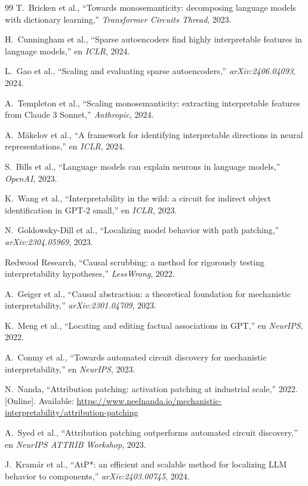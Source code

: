 \documentclass[11pt,a4paper]{report}
\theoremstyle{definition}
\begin{document}
\begin{thebibliography}{99}
T.~Bricken et al., ``Towards monosemanticity: decomposing language models with dictionary learning,'' \emph{Transformer Circuits Thread}, 2023.

H.~Cunningham et al., ``Sparse autoencoders find highly interpretable features in language models,'' en \emph{ICLR}, 2024.

L.~Gao et al., ``Scaling and evaluating sparse autoencoders,'' \emph{arXiv:2406.04093}, 2024.

A.~Templeton et al., ``Scaling monosemanticity: extracting interpretable features from Claude 3 Sonnet,'' \emph{Anthropic}, 2024.

A.~Mäkelov et al., ``A framework for identifying interpretable directions in neural representations,'' en \emph{ICLR}, 2024.

S.~Bills et al., ``Language models can explain neurons in language models,'' \emph{OpenAI}, 2023.

K.~Wang et al., ``Interpretability in the wild: a circuit for indirect object identification in GPT-2 small,'' en \emph{ICLR}, 2023.

N.~Goldowsky-Dill et al., ``Localizing model behavior with path patching,'' \emph{arXiv:2304.05969}, 2023.

Redwood Research, ``Causal scrubbing: a method for rigorously testing interpretability hypotheses,'' \emph{LessWrong}, 2022.

A.~Geiger et al., ``Causal abstraction: a theoretical foundation for mechanistic interpretability,'' \emph{arXiv:2301.04709}, 2023.

K.~Meng et al., ``Locating and editing factual associations in GPT,'' en \emph{NeurIPS}, 2022.

A.~Conmy et al., ``Towards automated circuit discovery for mechanistic interpretability,'' en \emph{NeurIPS}, 2023.

N.~Nanda, ``Attribution patching: activation patching at industrial scale,'' 2022. [Online]. Available: \url{https://www.neelnanda.io/mechanistic-interpretability/attribution-patching}

A.~Syed et al., ``Attribution patching outperforms automated circuit discovery,'' en \emph{NeurIPS ATTRIB Workshop}, 2023.

J.~Kramár et al., ``AtP*: an efficient and scalable method for localizing LLM behavior to components,'' \emph{arXiv:2403.00745}, 2024.

\end{thebibliography}
\end{document}
